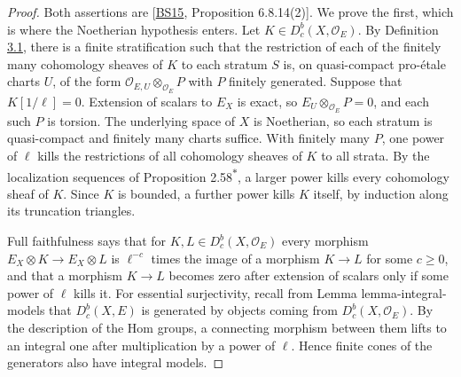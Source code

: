 \documentclass[11pt]{article}
\newcommand{\bpout}[1]{#1\textsuperscript{\hyperlink{bp-outside}{\ensuremath{\ast}}}}
\providecommand{\Dbc}{}\renewcommand{\Dbc}{D^b_c}
\begin{document}
\begin{proof}[{Proof}]\label{bp92}%
Both assertions are [\hyperref[bp93]{BS15}, Proposition 6.8.14(2)]. We prove the first, which is where the Noetherian hypothesis enters. Let \(K\in\Dbc(X,\mathcal O_E)\). By Definition \hyperref[bp7]{3.1}, there is a finite stratification such that the restriction of each of the finitely many cohomology sheaves of \(K\) to each stratum \(S\) is, on quasi-compact pro-étale charts \(U\), of the form \(\mathcal O_{E,U}\otimes_{\mathcal O_E}P\) with \(P\) finitely generated. Suppose that \(K[1/\ell]=0\). Extension of scalars to \(E_X\) is exact, so \(E_U\otimes_{\mathcal O_E}P=0\), and each such \(P\) is torsion. The underlying space of \(X\) is Noetherian, so each stratum is quasi-compact and finitely many charts suffice. With finitely many \(P\), one power of \(\ell\) kills the restrictions of all cohomology sheaves of \(K\) to all strata. By the localization sequences of Proposition \bpout{2.58}, a larger power kills every cohomology sheaf of \(K\). Since \(K\) is bounded, a further power kills \(K\) itself, by induction along its truncation triangles.

Full faithfulness says that for \(K,L\in\Dbc(X,\mathcal O_E)\) every morphism \(E_X\otimes K\to E_X\otimes L\) is \(\ell^{-c}\) times the image of a morphism \(K\to L\) for some \(c\geq0\), and that a morphism \(K\to L\) becomes zero after extension of scalars only if some power of \(\ell\) kills it. For essential surjectivity, recall from Lemma lemma-integral-models that \(\Dbc(X,E)\) is generated by objects coming from \(\Dbc(X,\mathcal O_E)\). By the description of the Hom groups, a connecting morphism between them lifts to an integral one after multiplication by a power of \(\ell\). Hence finite cones of the generators also have integral models.
\end{proof}



\clearpage{}\hypertarget{bp-outside}{}%
\end{document}
